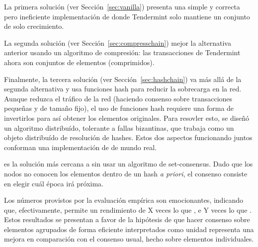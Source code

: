 %
La primera solución (ver Sección~\ref{sec:vanilla}) presenta una simple y
correcta pero ineficiente implementación de \setchain donde Tendermint solo mantiene
un conjunto de solo crecimiento.

%
La segunda solución (ver Sección~\ref{sec:compresschain}) mejor la alternativa anterior
usando un algoritmo de compresión: las transacciones de Tendermint ahora son conjuntos
de elementos (comprimidos).

%
Finalmente, la tercera solución (ver Sección~\ref{sec:hashchain}) va más allá de la
segunda alternativa y usa funciones hash para reducir la sobrecarga en la red.
Aunque reduzca el tráfico de la red (haciendo consenso sobre transacciones pequeñas
y de tamaño fijo), el uso de funciones hash requiere una forma de
invertirlos para así obtener los elementos originales.
Para resovler esto, se diseñó
un algoritmo distribuído, tolerante a fallas bizantinas, que trabaja como un objeto
distribuído de resolución de hashes.
Estos dos aspectos funcionando juntos conforman una implementación de \setchain
de mundo real.

%
\hashchain es la solución más cercana a \setchain sin usar un algoritmo de set-consensus.
Dado que los nodos no conocen los elementos dentro de un hash \emph{a priori}, el
consenso consiste en elegir cuál época irá próxima.
%


Los números provistos por la evaluación empírica son emocionantes, indicando que,
efectivamente, \hashchain permite un rendimiento de X veces lo que \vanilla, e Y veces
lo que \compresschain.
Estos resultados se presentan a favor de la hipótesis de que hacer consenso sobre
elementos agrupados de forma eficiente interpretados como unidad representa una
mejora en comparación con el consenso usual, hecho sobre elementos individuales. 

